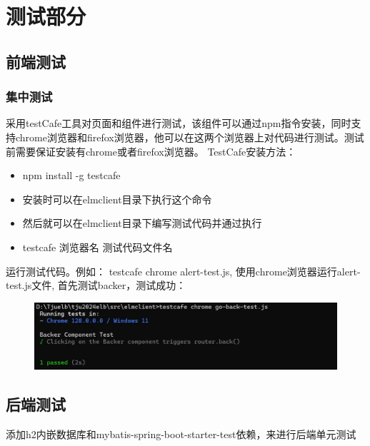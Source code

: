 \chapter{测试部分}

\section{前端测试}
\subsection{集中测试}
采用testCafe工具对页面和组件进行测试，该组件可以通过npm指令安装，同时支持chrome浏览器和firefox浏览器，他可以在这两个浏览器上对代码进行测试。测试前需要保证安装有chrome或者firefox浏览器。
TestCafe安装方法：
\begin{itemize}
    \item npm install -g testcafe
    \item 安装时可以在elmclient目录下执行这个命令
    \item 然后就可以在elmclient目录下编写测试代码并通过执行
    \item testcafe 浏览器名 测试代码文件名
\end{itemize}
运行测试代码。例如：
testcafe chrome alert-test.js,
使用chrome浏览器运行alert-test.js文件,
首先测试backer，测试成功：
    \begin{figure}[H]
        \centering
        \includegraphics[width=0.75\linewidth]{pics/test1.png}
    \end{figure}













\section{后端测试}
添加h2内嵌数据库和mybatis-spring-boot-starter-test依赖，来进行后端单元测试

